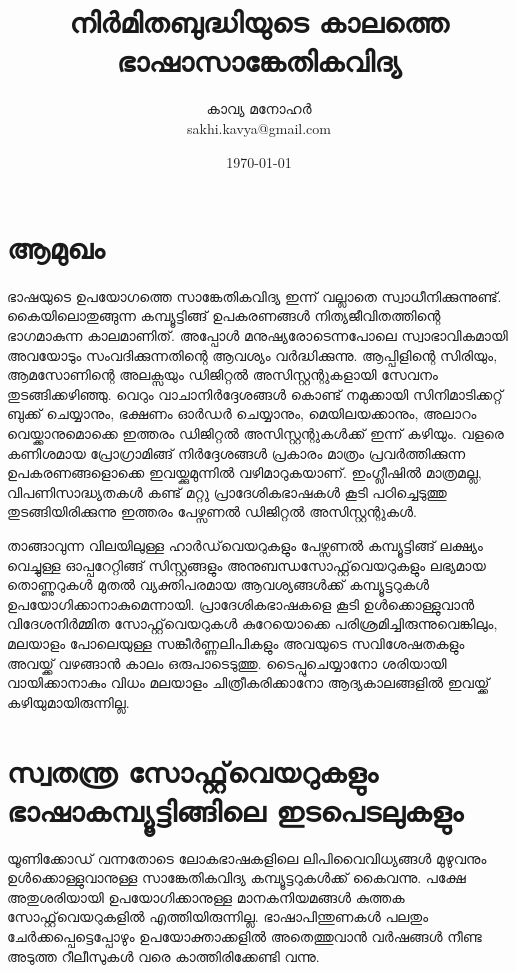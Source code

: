 \documentclass[12pt,twoside,a4paper]{article}
\title{\textbf{നിർമിതബുദ്ധിയുടെ കാലത്തെ ഭാഷാസാങ്കേതികവിദ്യ}}
\author{കാവ്യ മനോഹർ \\ sakhi.kavya@gmail.com}
\date{\today}
\begin{document}
\maketitle
{}


\section{ആമുഖം}
\paragraph{}
ഭാഷയുടെ ഉപയോഗത്തെ സാങ്കേതികവിദ്യ ഇന്ന് വല്ലാതെ സ്വാധീനിക്കുന്നുണ്ട്. കൈയിലൊതുങ്ങുന്ന കമ്പ്യൂട്ടിങ്ങ് ഉപകരണങ്ങൾ നിത്യജീവിതത്തിന്റെ ഭാഗമാകുന്ന കാലമാണിത്. അപ്പോൾ മനുഷ്യരോടെന്നപോലെ സ്വാഭാവികമായി അവയോടും സംവദിക്കുന്നതിന്റെ ആവശ്യം വർദ്ധിക്കുന്നു. ആപ്പിളിന്റെ സിരിയും, ആമസോണിന്റെ അലക്സയും ഡിജിറ്റൽ അസിസ്റ്റന്റുകളായി സേവനം തുടങ്ങിക്കഴിഞ്ഞു. വെറും വാചാനിർദ്ദേശങ്ങൾ കൊണ്ട് നമുക്കായി സിനിമാടിക്കറ്റ് ബുക്ക് ചെയ്യാനും, ഭക്ഷണം ഓർഡർ ചെയ്യാനും, മെയിലയക്കാനും, അലാറം വെയ്ക്കാനുമൊക്കെ ഇത്തരം ഡിജിറ്റൽ അസിസ്റ്റന്റുകൾക്ക് ഇന്ന് കഴിയും. വളരെ കണിശമായ പ്രോഗ്രാമിങ്ങ് നിർദ്ദേശങ്ങൾ പ്രകാരം മാത്രം പ്രവർത്തിക്കുന്ന ഉപകരണങ്ങളൊക്കെ ഇവയ്ക്കുമുന്നിൽ വഴിമാറുകയാണ്.  ഇംഗ്ലീഷിൽ മാത്രമല്ല, വിപണിസാദ്ധ്യതകൾ കണ്ട് മറ്റു പ്രാദേശികഭാഷകൾ കൂടി പഠിച്ചെടുത്തു തുടങ്ങിയിരിക്കുന്നു ഇത്തരം പേഴ്സണൽ ഡിജിറ്റൽ അസിസ്റ്റന്റുകൾ.

താങ്ങാവുന്ന വിലയിലുള്ള ഹാർഡ്‌വെയറുകളും പേഴ്സണൽ കമ്പ്യൂട്ടിങ്ങ് ലക്ഷ്യം വെച്ചുള്ള ഓപ്പറേറ്റിങ്ങ് സിസ്റ്റങ്ങളും അനുബന്ധസോഫ്റ്റ്‌വെയറുകളും ലഭ്യമായ തൊണ്ണുറുകൾ മുതൽ വ്യക്തിപരമായ ആവശ്യങ്ങൾക്ക്  കമ്പ്യൂട്ടറുകൾ ഉപയോഗിക്കാനാകുമെന്നായി. പ്രാദേശികഭാഷകളെ കൂടി ഉൾക്കൊള്ളുവാൻ  വിദേശനിർമ്മിത സോഫ്റ്റ്‌വെയറുകൾ കുറേയൊക്കെ പരിശ്രമിച്ചിരുന്നുവെങ്കിലും, മലയാളം പോലെയുള്ള സങ്കീർണ്ണലിപികളും അവയുടെ സവിശേഷതകളും അവയ്ക്ക് വഴങ്ങാൻ കാലം ഒരുപാടെടുത്തു. ടൈപ്പുചെയ്യാനോ ശരിയായി വായിക്കാനാകും വിധം മലയാളം ചിത്രീകരിക്കാനോ ആദ്യകാലങ്ങളിൽ ഇവയ്ക്ക് കഴിയുമായിരുന്നില്ല. 


\section{സ്വതന്ത്ര സോഫ്റ്റ്‌വെയറുകളും ഭാഷാകമ്പ്യൂട്ടിങ്ങിലെ ഇടപെടലുകളും}

യൂണിക്കോഡ് വന്നതോടെ ലോകഭാഷകളിലെ ലിപിവൈവിധ്യങ്ങൾ മുഴുവനും ഉൾക്കൊള്ളുവാനുള്ള സാങ്കേതികവിദ്യ കമ്പ്യൂട്ടറുകൾക്ക് കൈവന്നു. പക്ഷേ അതുശരിയായി ഉപയോഗിക്കാനുള്ള  മാനകനിയമങ്ങൾ കുത്തക സോഫ്റ്റ്‌വെയറുകളിൽ എത്തിയിരുന്നില്ല. ഭാഷാപിന്തുണകൾ പലതും ചേർക്കപ്പെട്ടെപ്പോഴും  ഉപയോക്താക്കളിൽ അതെത്തുവാൻ വർഷങ്ങൾ നീണ്ട അടുത്ത റീലീസുകൾ വരെ കാത്തിരിക്കേണ്ടി വന്നു. 
\end{document}
